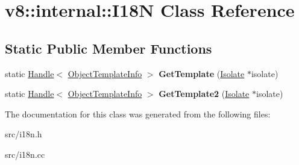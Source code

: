 \hypertarget{classv8_1_1internal_1_1_i18_n}{}\section{v8\+:\+:internal\+:\+:I18\+N Class Reference}
\label{classv8_1_1internal_1_1_i18_n}
\subsection*{Static Public Member Functions}
\begin{DoxyCompactItemize}
\item 
\hypertarget{classv8_1_1internal_1_1_i18_n_a54e221e24c3dac93c7fbe406d395c893}{}static \hyperlink{classv8_1_1internal_1_1_handle}{Handle}$<$ \hyperlink{classv8_1_1internal_1_1_object_template_info}{Object\+Template\+Info} $>$ {\bfseries Get\+Template} (\hyperlink{classv8_1_1internal_1_1_isolate}{Isolate} $\ast$isolate)\label{classv8_1_1internal_1_1_i18_n_a54e221e24c3dac93c7fbe406d395c893}

\item 
\hypertarget{classv8_1_1internal_1_1_i18_n_aa9bc46286cf0208bd8c0b85f90c4e936}{}static \hyperlink{classv8_1_1internal_1_1_handle}{Handle}$<$ \hyperlink{classv8_1_1internal_1_1_object_template_info}{Object\+Template\+Info} $>$ {\bfseries Get\+Template2} (\hyperlink{classv8_1_1internal_1_1_isolate}{Isolate} $\ast$isolate)\label{classv8_1_1internal_1_1_i18_n_aa9bc46286cf0208bd8c0b85f90c4e936}

\end{DoxyCompactItemize}


The documentation for this class was generated from the following files\+:\begin{DoxyCompactItemize}
\item 
src/i18n.\+h\item 
src/i18n.\+cc\end{DoxyCompactItemize}
